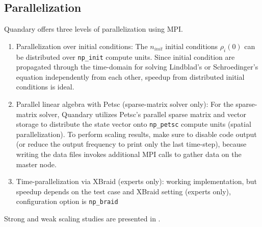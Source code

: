\documentclass[11pt]{article}
\begin{document}
    \subsection{Parallelization}
    Quandary offers three levels of parallelization using MPI. 
    \begin{enumerate}
    \item Parallelization over initial conditions: The $n_{init}$ initial conditions $\rho_i(0)$ can be distributed over \texttt{np\_init} compute units. Since initial condition are propagated through the time-domain for solving Lindblad's or Schroedinger's equation independently from each other, speedup from distributed initial conditions is ideal. 
    \item Parallel linear algebra with Petsc (sparse-matrix solver only): For the sparse-matrix solver, Quandary utilizes Petsc's parallel sparse matrix and vector storage to distribute the state vector onto \texttt{np\_petsc} compute units (spatial parallelization). To perform scaling results, make sure to disable code output (or reduce the output frequency to print only the last time-step), because writing the data files invokes additional MPI calls to gather data on the master node.
    \item Time-parallelization via XBraid (experts only): working implementation, but
      speedup depends on the test case and XBraid setting (experts only),
      configuration option is \texttt{np\_braid}
    \end{enumerate}
    Strong and weak scaling studies are presented in \cite{guenther2021quantum}.
\end{document}
